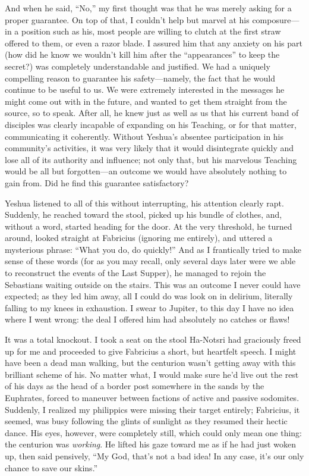 And when he said, ``No,'' my first thought was that he was merely asking for a proper guarantee. On top of that, I couldn't help but marvel at his composure---in a position such as his, most people are willing to clutch at the first straw offered to them, or even a razor blade. I assured him that any anxiety on his part (how did he know we wouldn't kill him after the ``appearances'' to keep the secret?) was completely understandable and justified. We had a uniquely compelling reason to guarantee his safety---namely, the fact that he would continue to be useful to us. We were extremely interested in the messages he might come out with in the future, and wanted to get them straight from the source, so to speak. After all, he knew just as well as us that his current band of disciples was clearly incapable of expanding on his Teaching, or for that matter, communicating it coherently. Without Yeshua's absentee participation in his community's activities, it was very likely that it would disintegrate quickly and lose all of its authority and influence; not only that, but his marvelous Teaching would be all but forgotten---an outcome we would have absolutely nothing to gain from. Did he find this guarantee satisfactory?

Yeshua listened to all of this without interrupting, his attention clearly rapt. Suddenly, he reached toward the stool, picked up his bundle of clothes, and, without a word, started heading for the door. At the very threshold, he turned around, looked straight at Fabricius (ignoring me entirely), and uttered a mysterious phrase: ``What you do, do quickly!'' And as I frantically tried to make sense of these words (for as you may recall, only several days later were we able to reconstruct the events of the Last Supper), he managed to rejoin the Sebastians waiting outside on the stairs. This was an outcome I never could have expected; as they led him away, all I could do was look on in delirium, literally falling to my knees in exhaustion. I swear to Jupiter, to this day I have no idea where I went wrong: the deal I offered him had absolutely no catches or flaws!

It was a total knockout. I took a seat on the stool Ha-Notsri had graciously freed up for me and proceeded to give Fabricius a short, but heartfelt speech. I might have been a dead man walking, but the centurion wasn't getting away with this brilliant scheme of his. No matter what, I would make sure he'd live out the rest of his days as the head of a border post somewhere in the sands by the Euphrates, forced to maneuver between factions of active and passive sodomites. Suddenly, I realized my philippics were missing their target entirely; Fabricius, it seemed, was busy following the glints of sunlight as they resumed their hectic dance. His eyes, however, were completely still, which could only mean one thing: the centurion was \emph{working}. He lifted his gaze toward me as if he had just woken up, then said pensively, ``My God, that's not a bad idea! In any case, it's our only chance to save our skins.''

